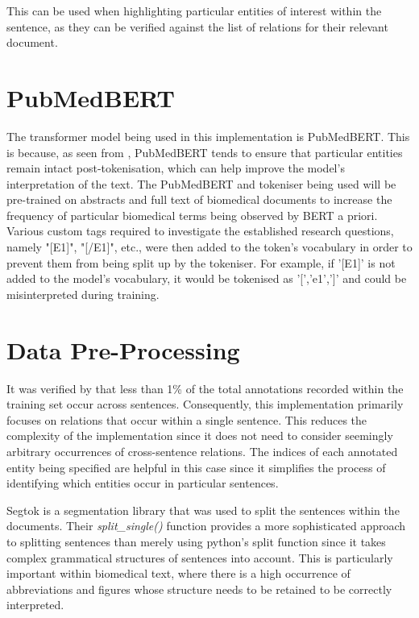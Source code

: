 \documentclass{l4proj}
\begin{document}
This can be used when highlighting particular entities of interest within the sentence, as they can be verified against the list of relations for their relevant document.

\section{PubMedBERT}
The transformer model being used in this implementation is PubMedBERT. This is because, as seen from \cite{PubMedBERT}, PubMedBERT tends to ensure that particular entities remain intact post-tokenisation, which can help improve the model's interpretation of the text. The PubMedBERT and tokeniser being used will be pre-trained on abstracts and full text of biomedical documents to increase the frequency of particular biomedical terms being observed by BERT a priori. Various custom tags required to investigate the established research questions, namely "[E1]", "[/E1]", etc., were then added to the token's vocabulary in order to prevent them from being split up by the tokeniser. For example, if '[E1]' is not added to the model's vocabulary, it would be tokenised as '[','e1',']' and could be misinterpreted during training.

\section{Data Pre-Processing}

It was verified by \cite{tag} that less than 1\% of the total annotations recorded within the training set occur across sentences. Consequently, this implementation primarily focuses on relations that occur within a single sentence. This reduces the complexity of the implementation since it does not need to consider seemingly arbitrary occurrences of cross-sentence relations. The indices of each annotated entity being specified are helpful in this case since it simplifies the process of identifying which entities occur in particular sentences.

Segtok is a segmentation library that was used to split the sentences within the documents. Their \emph{split\_single()} function provides a more sophisticated approach to splitting sentences than merely using python's split function since it takes complex grammatical structures of sentences into account. This is particularly important within biomedical text, where there is a high occurrence of abbreviations and figures whose structure needs to be retained to be correctly interpreted.
\end{document}
